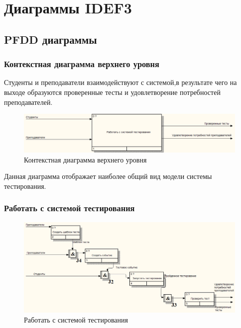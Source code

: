 \section{Диаграммы IDEF3}
\subsection{PFDD диаграммы}

\subsubsection{Контекстная диаграмма верхнего уровня}

Студенты и преподаватели взаимодействуют с системой,в результате чего на выходе
образуются проверенные тесты и удовлетворение потребностей преподавателей.

\begin{figure}[H]
    \includegraphics[width=\textwidth, center]{../img/idef3/Context.png}
    \caption{Контекстная диаграмма верхнего уровня}
\end{figure}

Данная диаграмма отображает наиболее общий вид модели системы тестирования.

\subsubsection{Работать с системой тестирования}
\begin{figure}[H]
    \includegraphics[width=\textwidth, center]{../img/idef3/ContextDecompose.png}
    \caption{Работать с системой тестирования}
\end{figure}

